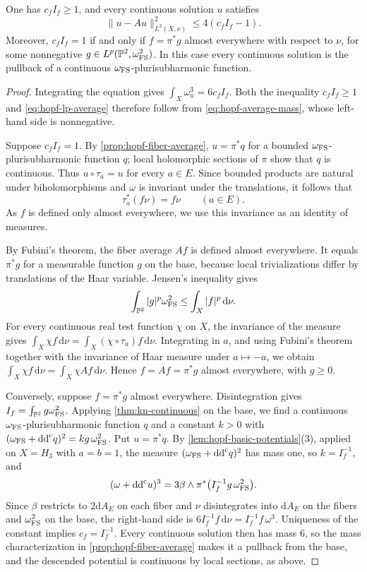 \begin{proposition}\label{prop:hopf-lp-normalization}
One has $c_f I_f\geq1$, and every continuous solution $u$ satisfies
\begin{equation}\label{eq:hopf-lp-average}
 \|u-Au\|_{L^2(X,\nu)}^2\leq4(c_f I_f-1).
\end{equation}
Moreover, $c_f I_f=1$ if and only if $f=\pi^*g$ almost everywhere with respect to $\nu$, for some nonnegative $g\in L^p(\mathbb P^2,\omega_{\mathrm{FS}}^2)$. In this case every continuous solution is the pullback of a continuous $\omega_{\mathrm{FS}}$-plurisubharmonic function.
\end{proposition}
\begin{proof}
Integrating the equation gives $\int_X\omega_u^3=6c_f I_f$. Both the inequality $c_fI_f\geq1$ and \eqref{eq:hopf-lp-average} therefore follow from \eqref{eq:hopf-average-mass}, whose left-hand side is nonnegative.

Suppose $c_f I_f=1$. By \cref{prop:hopf-fiber-average}, $u=\pi^*q$ for a bounded $\omega_{\mathrm{FS}}$-plurisubharmonic function $q$; local holomorphic sections of $\pi$ show that $q$ is continuous. Thus $u\circ\tau_a=u$ for every $a\in E$. Since bounded products are natural under biholomorphisms and $\omega$ is invariant under the translations, it follows that
\[
 \tau_a^*(f\nu)=f\nu\qquad(a\in E).
\]
As $f$ is defined only almost everywhere, we use this invariance as an identity of measures.

By Fubini's theorem, the fiber average $Af$ is defined almost everywhere. It equals $\pi^*g$ for a measurable function $g$ on the base, because local trivializations differ by translations of the Haar variable. Jensen's inequality gives
\[
 \int_{\mathbb P^2}|g|^p\omega_{\mathrm{FS}}^2
 \leq\int_X|f|^p\,\mathrm{d}\nu.
\]
For every continuous real test function $\chi$ on $X$, the invariance of the measure gives $\int_X\chi f\,\mathrm{d}\nu=\int_X(\chi\circ\tau_a)f\,\mathrm{d}\nu$. Integrating in $a$, and using Fubini's theorem together with the invariance of Haar measure under $a\mapsto-a$, we obtain $\int_X\chi f\,\mathrm{d}\nu=\int_X\chi Af\,\mathrm{d}\nu$. Hence $f=Af=\pi^*g$ almost everywhere, with $g\geq0$.

Conversely, suppose $f=\pi^*g$ almost everywhere. Disintegration gives $I_f=\int_{\mathbb P^2}g\omega_{\mathrm{FS}}^2$. Applying \cref{thm:kn-continuous} on the base, we find a continuous $\omega_{\mathrm{FS}}$-plurisubharmonic function $q$ and a constant $k>0$ with $(\omega_{\mathrm{FS}}+\mathrm{dd}^{\mathrm{c}} q)^2=kg\,\omega_{\mathrm{FS}}^2$. Put $u=\pi^*q$. By \cref{lem:hopf-basic-potentials}(3), applied on $X=H_3$ with $a=b=1$, the measure $(\omega_{\mathrm{FS}}+\mathrm{dd}^{\mathrm{c}} q)^2$ has mass one, so $k=I_f^{-1}$, and
\[
 (\omega+\mathrm{dd}^{\mathrm{c}} u)^3=3\beta\wedge\pi^*\bigl(I_f^{-1}g\,\omega_{\mathrm{FS}}^2\bigr).
\]
Since $\beta$ restricts to $2\mathrm{d}A_E$ on each fiber and $\nu$ disintegrates into $\mathrm{d}A_E$ on the fibers and $\omega_{\mathrm{FS}}^2$ on the base, the right-hand side is $6I_f^{-1}f\,\mathrm{d}\nu=I_f^{-1}f\,\omega^3$. Uniqueness of the constant implies $c_f=I_f^{-1}$. Every continuous solution then has mass $6$, so the mass characterization in \cref{prop:hopf-fiber-average} makes it a pullback from the base, and the descended potential is continuous by local sections, as above.
\end{proof}

